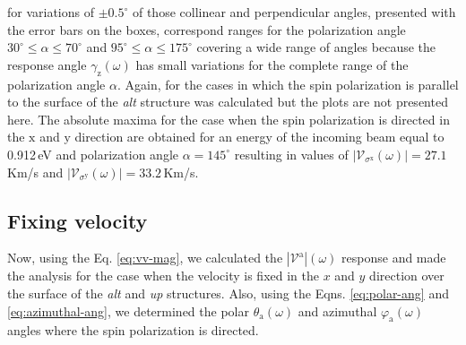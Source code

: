 \documentclass[prb,11pt,tightenlines,twocolumn,aps]{revtex4-1}
\begin{document}
for variations of $\pm0.5^{\circ}$ of those collinear and perpendicular angles,
presented with the error bars on the boxes, correspond ranges for the
polarization angle $30^{\circ} \leq \alpha \leq 70^{\circ}$ and $95^{\circ} \leq
\alpha \leq 175^{\circ}$ covering a wide range of angles because the response
angle $\gamma_{\mathrm{z}}(\omega)$ has small variations for the complete range
of the polarization angle $\alpha$.
% 
Again, for the cases in which the spin polarization is parallel to the surface
of the \emph{alt} structure was calculated but the plots are not presented here.
The absolute maxima for the case when the spin polarization is directed in the
$\mathrm{x}$ and $\mathrm{y}$ direction are obtained for an energy of the
incoming beam equal to 0.912\,eV and polarization angle $\alpha=145^{\circ}$
resulting in values of $|\mathcal{V}_{\sigma^{\mathrm{x}}}(\omega)|=27.1$\,Km/s
and $|\mathcal{V}_{\sigma^{\mathrm{y}}}(\omega)|=33.2$\,Km/s.



\subsection{Fixing velocity} %
\label{sec:res-fixvel}



Now, using the Eq. \eqref{eq:vv-mag}, we calculated the
$|\mathcal{V}^{\mathrm{a}}|(\omega)$ response and made the analysis for the case
when the velocity is fixed in the $x$ and $y$ direction over the surface of the
\emph{alt} and \emph{up} structures. Also, using the Eqns. \eqref{eq:polar-ang}
and \eqref{eq:azimuthal-ang}, we determined the polar
$\theta_{\mathrm{a}}(\omega)$ and azimuthal $\varphi_{\mathrm{a}}(\omega)$
angles where the spin polarization is directed.
\end{document}
